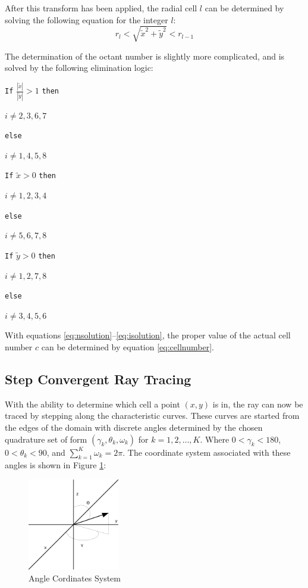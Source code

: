 \documentclass{article}
\begin{document}
After this transform has been applied, the radial cell $l$ can be determined by solving the following equation for the integer $l$:
\begin{equation}
r_l<\sqrt{\tilde{x}^2+\tilde{y}^2}<r_{l-1}
\label{eq:lsolution}
\end{equation}

The determination of the octant number is slightly more complicated, and is solved by the following elimination logic:

\vspace{5mm}
\texttt{If} $\frac{|\tilde{x}|}{|\tilde{y}|} > 1$ \texttt{then}

\qquad $i\ne 2, 3, 6, 7$

\texttt{else}

\qquad $i\ne 1, 4, 5, 8$

\texttt{If} $\tilde{x} > 0$ \texttt{then}

\qquad $i\ne 1, 2, 3, 4$

\texttt{else}

\qquad $i\ne 5, 6, 7, 8$

\texttt{If} $\tilde{y} > 0$ \texttt{then}

\qquad $i\ne 1, 2, 7, 8$

\texttt{else}

\qquad $i\ne 3, 4, 5, 6$
\begin{equation}
\label{eq:isolution}
\end{equation}

With equations \ref{eq:nsolution}--\ref{eq:isolution}, the proper value of the actual cell number $c$ can be determined by equation \ref{eq:cellnumber}.

\subsection{Step Convergent Ray Tracing}

With the ability to determine which cell a point $(x,y)$ is in, the ray can now be traced by stepping along the characteristic curves. These curves are started from the edges of the domain with discrete angles determined by the chosen quadrature set of form $(\gamma_k,\theta_k,\omega_k)$ for $k=1,2,\dots,K$. Where $0<\gamma_k<180$, $0<\theta_k<90$, and $\sum_{k=1}^K\omega_k=2\pi$. The coordinate system associated with these angles is shown in Figure \ref{fig:anglecords}:

\begin{figure}[h]
\begin{center}
\includegraphics[width=40mm]{coordinates.png}
\caption{Angle Cordinates System}
\end{center}
\label{fig:anglecords}
\end{figure}
\end{document}
